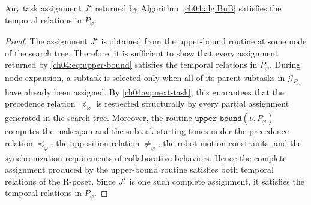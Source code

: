 \begin{lemma}
\label{ch04:lemma:BnB-satisfying}
Any task assignment $J^{\star}$ returned by
Algorithm~\ref{ch04:alg:BnB} satisfies the temporal relations in
$P_{\varphi}$.
\end{lemma}

\begin{proof}
The assignment $J^{\star}$ is obtained from the upper-bound routine at some
node of the search tree. Therefore, it is sufficient to show that every
assignment returned by \eqref{ch04:eq:upper-bound} satisfies the temporal
relations in $P_{\varphi}$.
During node expansion, a subtask is selected only when all of its parent
subtasks in $\mathcal{G}_{P_{\varphi}}$ have already been assigned. By
\eqref{ch04:eq:next-task}, this guarantees that the precedence relation
$\preceq_{\varphi}$ is respected structurally by every partial assignment
generated in the search tree. Moreover, the routine
$\texttt{upper\_bound}(\nu,P_{\varphi})$ computes the makespan and the subtask
starting times under the precedence relation $\preceq_{\varphi}$, the
opposition relation $\neq_{\varphi}$, the robot-motion constraints, and the
synchronization requirements of collaborative behaviors. Hence the complete
assignment produced by the upper-bound routine satisfies both temporal
relations of the R-poset.
Since $J^{\star}$ is one such complete assignment, it satisfies the temporal
relations in $P_{\varphi}$.
\end{proof}
